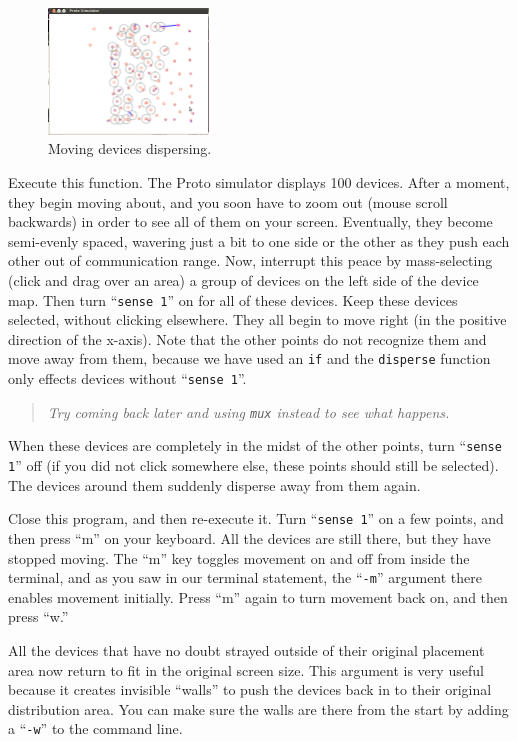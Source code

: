 \documentclass{article}
\newcommand\problem[1]{\begin{quote}{\em #1}\end{quote}}
\newcommand\var[1]{{\tt #1}}
\newcommand\qvar[1]{``{\tt #1}''}
\begin{document}
\begin{figure}
  \includegraphics[width=0.38\textwidth]{figures/motion.png}
  \caption{Moving devices dispersing.}
  \label{f:motion}
\end{figure}

Execute this function.  The Proto simulator displays 100 devices.
After a moment, they begin moving about, and you soon have to zoom out
(mouse scroll backwards) in order to see all of them on your screen.
Eventually, they become semi-evenly spaced, wavering just a bit to one
side or the other as they push each other out of communication range.
Now, interrupt this peace by mass-selecting (click and drag over an
area) a group of devices on the left side of the device map.  Then
turn \qvar{sense 1} on for all of these devices.  Keep these devices
selected, without clicking elsewhere.  They all begin to move right
(in the positive direction of the x-axis).  Note that the other
points do not recognize them and move away from them, because we have
used an \var{if} and the \var{disperse} function only effects devices
without \qvar{sense 1}.  \problem{Try coming back later and using \var{mux}
instead to see what happens.}

When these devices are completely in the midst of the other points,
turn \qvar{sense 1} off (if you did not click somewhere else, these
points should still be selected).  The devices around them suddenly
disperse away from them again.

Close this program, and then re-execute it.  Turn \qvar{sense 1} on a
few points, and then press ``m'' on your keyboard.  All the devices
are still there, but they have stopped moving.  The ``m'' key toggles
movement on and off from inside the terminal, and as you saw in our
terminal statement, the \qvar{-m} argument there enables movement
initially.  Press ``m'' again to turn movement back on, and then press
``w.''

All the devices that have no doubt strayed outside of their original
placement area now return to fit in the original screen size.  This
argument is very useful because it creates invisible ``walls'' to push
the devices back in to their original distribution area.  You can make
sure the walls are there from the start by adding a \qvar{-w} to the
command line.
\end{document}
